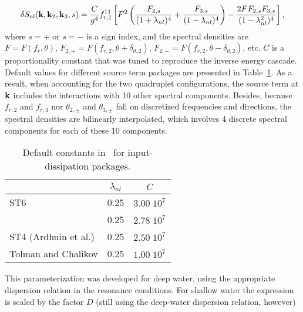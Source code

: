 \begin{equation}
\delta S_{\mathrm{nl}}(\mbox{\bf k},\mbox{\bf k}_2,\mbox{\bf k}_3,s) =  \frac{C}{g^4} f_{r,1}^{11} \left [ F^2 \left ( \frac{F_{2,s}}{(1+\lambda_{nl})^4} +
        \frac{F_{3,s}}{(1-\lambda_{nl})^4} \right ) - \frac{2 F F_{2,s} F_{3,s}}{(1-\lambda_{nl}^2)^4} \right] ,
      \label{eq:snl_dia}
\end{equation}
where $s=+$ or $s=-$ is a sign index, and the spectral densities are  $F = F(f_{r} ,\theta)$, $F_{2,+} = F(f_{r,2} ,\theta + \delta_{\theta,2})$, $F_{2,-} = F(f_{r,2} ,\theta - \delta_{\theta,2})$,  etc.
 $C$ is a proportionality constant that was tuned to reproduce the inverse energy cascade.  Default values for different source term packages are presented in Table~\ref{tab:snl_par}.
As a result, when accounting for the two quadruplet configurations, the source term at $\mbox{\bf k}$ includes the interactions with 
10 other spectral components. Besides, because $f_{r,2}$ and $f_{r,3}$ nor $\theta_{2,\pm} $ and $\theta_{3,\pm} $ fall on discretized frequencies and directions, the spectral densities are bilinearly interpolated, which involves 4 discrete spectral components for each of these 10 components. 




\begin{table} \begin{center}
 \begin{tabular}{|l|c|c|} \hline
                    & $\lambda_{nl}$ &     $C$      \\ \hline
ST6                 &      0.25      & $3.00 \; 10^7$  \\ \hline
\wam-3              &      0.25      & $2.78 \; 10^7$  \\ \hline
ST4 (Ardhuin et al.)&      0.25      & $2.50 \; 10^7$  \\ \hline
Tolman and Chalikov &      0.25      & $1.00 \; 10^7$  \\ \hline
\end{tabular} \end{center}
\caption{Default constants in \dia\ for input-dissipation packages.}
\label{tab:snl_par} \botline \end{table}

This parameterization was developed for deep water, using the appropriate dispersion
relation in the resonance conditions. For shallow water the expression is
scaled by the factor $D$ (still using the deep-water dispersion relation,
however)

